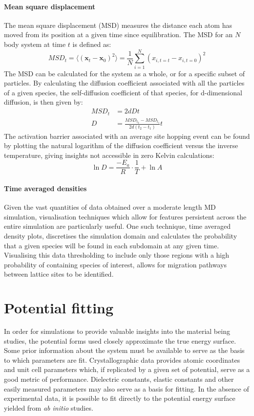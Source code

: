 \paragraph{Mean square displacement}
The mean square displacement (MSD) measures the distance each atom has moved from its position at a given time since equilibration.
The MSD for an $N$ body system at time $t$ is defined as:
\begin{equation}
	MSD_t = \langle (\mathbf{x}_t - \mathbf{x}_0)^2 \rangle = \frac{1}{N}\sum_{i=1}^N(x_{i, t = t} - x_{i, t = 0})^2
\end{equation}
The MSD can be calculated for the system as a whole, or for a specific subset of particles.
By calculating the diffusion coefficient associated with all the particles of a given species, the self-diffusion coefficient of that species, for d-dimensional diffusion, is then given by:
\begin{align}
	MSD_t &= 2dDt\\[5pt]
	D &= \frac{MSD_{t_2} - MSD_{t_1}}{2d(t_2 - t_1)}t
\end{align}
\noindent
The activation barrier associated with an average site hopping event can be found by plotting the natural logarithm of the diffusion coefficient versus the inverse temperature, giving insights not accessible in zero Kelvin calculations:
\begin{equation}
	\ln{D} = \frac{-E_a}{R}\cdot\frac{1}{T} + \ln{A}
\end{equation}

\paragraph{Time averaged densities}
Given the vast quantities of data obtained over a moderate length MD simulation, visualisation techniques which allow for features persistent across the entire simulation are particularly useful.
One such technique, time averaged density plots, discretises the simulation domain and calculates the probability that a given species will be found in each subdomain at any given time.
Visualising this data thresholding to include only those regions with a high probability of containing species of interest, allows for migration pathways between lattice sites to be identified.
\section{Potential fitting}
In order for simulations to provide valuable insights into the material being studies, the potential forms used closely approximate the true energy surface.
Some prior information about the system must be available to serve as the basis to which parameters are fit.
Crystallographic data provides atomic coordinates and unit cell parameters which, if replicated by a given set of potential, serve as a good metric of performance.
Dielectric constants, elastic constants and other easily measured parameters may also serve as a basis for fitting.
In the absence of experimental data, it is possible to fit directly to the potential energy surface yielded from \textit{ab initio} studies.



